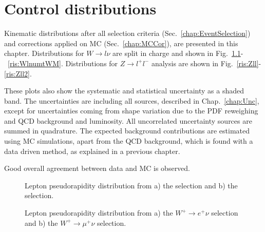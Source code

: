 \chapter{Control distributions}

Kinematic distributions after all selection criteria (Sec.~\ref{chap:EventSelection}) and corrections applied on MC (Sec.~\ref{chap:MCCor}), are presented in this chapter. Distributions for $W \to l\nu$ are split in charge and shown in Fig.~\ref{ris:WlnuLep}-~\ref{ris:WlnumtWM}. Distributions for $Z \to l^{+}l^{-}$ analysis are shown in Fig.~\ref{ris:Zll}-\ref{ris:Zll2}.  

These plots also show the systematic and statistical uncertainty as a shaded band. The uncertainties are including all sources, described in Chap.~\ref{chap:Unc}, except for uncertainties coming from shape variation due to the PDF reweighing and QCD background and luminosity.  All uncorrelated uncertainty sources are summed in quadrature. The expected background contributions are estimated using MC simulations, apart from the QCD background, which is found with a data driven method, as explained in a previous chapter.

Good overall agreement between data and MC is observed.



\begin{figure}[h]
\begin{minipage}[h]{0.49\linewidth}
\end{minipage}
\hfill
\begin{minipage}[h]{0.49\linewidth}
\end{minipage}
\caption{Lepton pseudorapidity distribution from a) the \wenu selection and  b) the \wmunu selection.}
\label{ris:WlnuLep}
\end{figure}

\begin{figure}[h]
\begin{minipage}[h]{0.49\linewidth}
\end{minipage}
\hfill
\begin{minipage}[h]{0.49\linewidth}
\end{minipage}
\label{ris:WlnuPLep}
\caption{Lepton pseudorapidity distribution from  a) the $W^{+} \to e^{+} \nu$ selection and  b) the $W^{+} \to \mu^{+} \nu$ selection.}
\end{figure}

